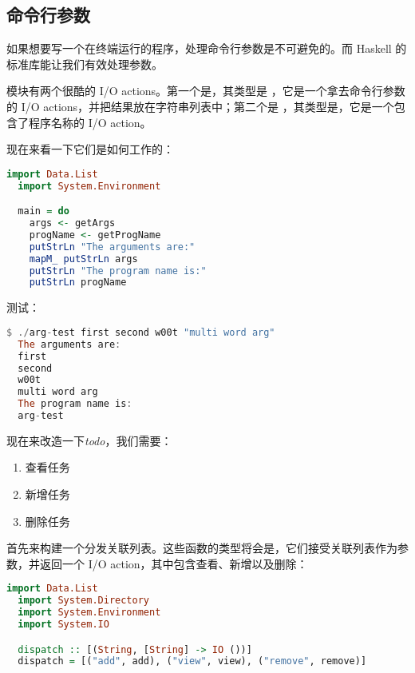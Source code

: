 \documentclass[./main.tex]{subfiles}
\begin{document}
\subsection*{命令行参数}

如果想要写一个在终端运行的程序，处理命令行参数是不可避免的。而 Haskell 的标准库能让我们有效处理参数。

模块有两个很酷的 I/O actions。第一个是，其类型是
，它是一个拿去命令行参数的 I/O actions，并把结果放在字符串列表中；第二个是
，其类型是，它是一个包含了程序名称的 I/O action。

现在来看一下它们是如何工作的：

\begin{lstlisting}[language=Haskell]
  import Data.List
  import System.Environment

  main = do
    args <- getArgs
    progName <- getProgName
    putStrLn "The arguments are:"
    mapM_ putStrLn args
    putStrLn "The program name is:"
    putStrLn progName
\end{lstlisting}

测试：

\begin{lstlisting}[language=Haskell]
  $ ./arg-test first second w00t "multi word arg"
  The arguments are:
  first
  second
  w00t
  multi word arg
  The program name is:
  arg-test
\end{lstlisting}

现在来改造一下\textit{todo}，我们需要：

\begin{enumerate}
  \item 查看任务
  \item 新增任务
  \item 删除任务
\end{enumerate}

首先来构建一个分发关联列表。这些函数的类型将会是，它们接受关联列表作为参数，并返回一个
I/O action，其中包含查看、新增以及删除：

\begin{lstlisting}[language=Haskell]
  import Data.List
  import System.Directory
  import System.Environment
  import System.IO

  dispatch :: [(String, [String] -> IO ())]
  dispatch = [("add", add), ("view", view), ("remove", remove)]
\end{lstlisting}
\end{document}
